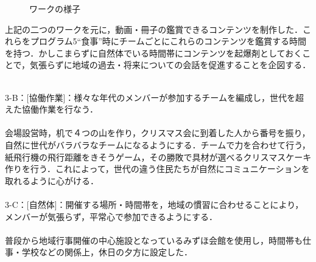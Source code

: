 \documentclass[a4paper]{jsarticle}
\begin{document}
\begin{itemize}
\begin{figure}[H]
\begin{center}
\begin{tabular}{cc}
  \end{tabular}
    \caption{ワークの様子}
    \label{fig:tmu_hino_yokonarabi}
  \end{center}
\end{figure}


上記の二つのワークを元に，動画・冊子の鑑賞できるコンテンツを制作した．これらをプログラム5“食事”時にチームごとにこれらのコンテンツを鑑賞する時間を持つ．かしこまらずに自然体でいる時間帯にコンテンツを起爆剤としておくことで，気張らずに地域の過去・将来についての会話を促進することを企図する．\\\\


\end{itemize}
3-B：[協働作業]：様々な年代のメンバーが参加するチームを編成し，世代を超えた協働作業を行なう．\\\\
会場設営時，机で４つの山を作り，クリスマス会に到着した人から番号を振り，自然に世代がバラバラなチームになるようにする．チームで力を合わせて行う，紙飛行機の飛行距離をきそうゲーム，その勝敗で具材が選べるクリスマスケーキ作りを行う．これによって，世代の違う住民たちが自然にコミュニケーションを取れるように心がける．\\\\

3-C：[自然体]：開催する場所・時間帯を，地域の慣習に合わせることにより，メンバーが気張らず，平常心で参加できるようにする．\\\\
普段から地域行事開催の中心施設となっているみずほ会館を使用し，時間帯も仕事・学校などの関係上，休日の夕方に設定した．\\\\
\end{document}
